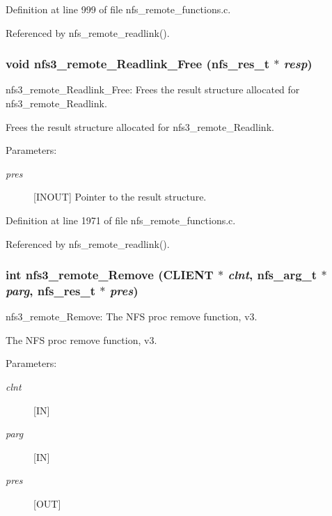 Definition at line 999 of file nfs\_\-remote\_\-functions.c.

Referenced by nfs\_\-remote\_\-readlink().
\subsubsection{\setlength{\rightskip}{0pt plus 5cm}void nfs3\_\-remote\_\-Readlink\_\-Free (nfs\_\-res\_\-t $\ast$ {\em resp})}\label{group__NFSprocs_ga77}


nfs3\_\-remote\_\-Readlink\_\-Free: Frees the result structure allocated for nfs3\_\-remote\_\-Readlink.

Frees the result structure allocated for nfs3\_\-remote\_\-Readlink.

\begin{Desc}
\item[Parameters:]
\begin{description}
\item[{\em pres}][INOUT] Pointer to the result structure. \end{description}
\end{Desc}


Definition at line 1971 of file nfs\_\-remote\_\-functions.c.

Referenced by nfs\_\-remote\_\-readlink().
\subsubsection{\setlength{\rightskip}{0pt plus 5cm}int nfs3\_\-remote\_\-Remove (CLIENT $\ast$ {\em clnt}, nfs\_\-arg\_\-t $\ast$ {\em parg}, nfs\_\-res\_\-t $\ast$ {\em pres})}\label{group__NFSprocs_ga26}


nfs3\_\-remote\_\-Remove: The NFS proc remove function, v3.

The NFS proc remove function, v3.

\begin{Desc}
\item[Parameters:]
\begin{description}
\item[{\em clnt}][IN] \item[{\em parg}][IN] \item[{\em pres}][OUT] \end{description}
\end{Desc}


